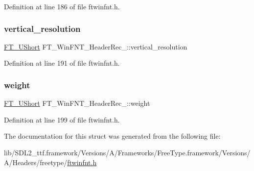 Definition at line 186 of file ftwinfnt.\+h.

\mbox{\label{struct_f_t___win_f_n_t___header_rec___ad8f76384c2eec492a559e66de170baba}} 
\subsubsection{\texorpdfstring{vertical\_resolution}{vertical\_resolution}}
{\footnotesize\ttfamily \mbox{\hyperlink{fttypes_8h_a937f6c17cf5ffd09086d8610c37b9f58}{F\+T\+\_\+\+U\+Short}} F\+T\+\_\+\+Win\+F\+N\+T\+\_\+\+Header\+Rec\+\_\+\+::vertical\+\_\+resolution}



Definition at line 191 of file ftwinfnt.\+h.

\mbox{\label{struct_f_t___win_f_n_t___header_rec___aa06f2d447dc9b048ae42498d03e361db}} 
\subsubsection{\texorpdfstring{weight}{weight}}
{\footnotesize\ttfamily \mbox{\hyperlink{fttypes_8h_a937f6c17cf5ffd09086d8610c37b9f58}{F\+T\+\_\+\+U\+Short}} F\+T\+\_\+\+Win\+F\+N\+T\+\_\+\+Header\+Rec\+\_\+\+::weight}



Definition at line 199 of file ftwinfnt.\+h.



The documentation for this struct was generated from the following file\+:\begin{DoxyCompactItemize}
\item 
lib/\+S\+D\+L2\+\_\+ttf.\+framework/\+Versions/\+A/\+Frameworks/\+Free\+Type.\+framework/\+Versions/\+A/\+Headers/freetype/\mbox{\hyperlink{ftwinfnt_8h}{ftwinfnt.\+h}}\end{DoxyCompactItemize}
